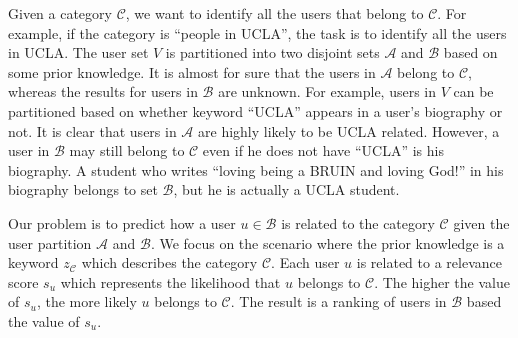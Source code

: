 \documentclass{article}
\begin{document}
Given a category $\mathcal{C}$, we want to identify all the users that belong to $\mathcal{C}$. For example, if the category is ``people in UCLA'', the task is to identify all the users in UCLA. The user set $V$ is partitioned into two disjoint sets $\mathcal{A}$ and $\mathcal{B}$ based on some prior knowledge. It is almost for sure that the users in $\mathcal{A}$ belong to $\mathcal{C}$, whereas the results for users in $\mathcal{B}$ are unknown. For example, users in $V$ can be partitioned based on whether keyword ``UCLA'' appears in a user's biography or not. It is clear that users in $\mathcal{A}$ are highly likely to be UCLA related. However, a user in $\mathcal{B}$ may still belong to $\mathcal{C}$ even if he does not have ``UCLA'' is his biography. A student who writes ``loving being a BRUIN and loving God!'' in his biography belongs to set $\mathcal{B}$, but he is actually a UCLA student.


Our problem is to predict how a user $u \in \mathcal{B}$ is related to the category $\mathcal{C}$ given the user partition $\mathcal{A}$ and $\mathcal{B}$. We focus on the scenario where the prior knowledge is a keyword $z_{\mathcal{C}}$ which describes the category $\mathcal{C}$. Each user $u$ is related to a relevance score $s_u$ which represents the likelihood that $u$ belongs to $\mathcal{C}$. The higher the value of $s_u$, the more likely $u$ belongs to $\mathcal{C}$. The result is a ranking of users in $\mathcal{B}$ based the value of $s_u$.


\ifx \allfiles \undefined
\end{document}
